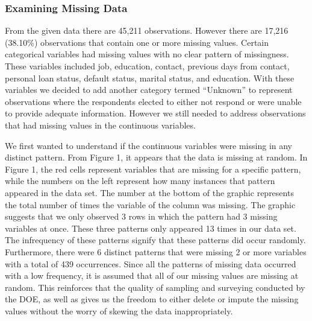 \documentclass[]{article}
\begin{document}
\hypertarget{examining-missing-data}{%
\subsubsection{Examining Missing Data}\label{examining-missing-data}}

From the given data there are 45,211 observations. However there are
17,216 (38.10\%) observations that contain one or more missing values.
Certain categorical variables had missing values with no clear pattern
of missingness. These variables included job, education, contact,
previous days from contact, personal loan status, default status,
marital status, and education. With these variables we decided to add
another category termed ``Unknown'' to represent observations where the
respondents elected to either not respond or were unable to provide
adequate information. However we still needed to address observations
that had missing values in the continuous variables.

We first wanted to understand if the continuous variables were missing
in any distinct pattern. From Figure 1, it appears that the data is
missing at random. In Figure 1, the red cells represent variables that
are missing for a specific pattern, while the numbers on the left
represent how many instances that pattern appeared in the data set. The
number at the bottom of the graphic represents the total number of times
the variable of the column was missing. The graphic suggests that we
only observed 3 rows in which the pattern had 3 missing variables at
once. These three patterns only appeared 13 times in our data set. The
infrequency of these patterns signify that these patterns did occur
randomly. Furthermore, there were 6 distinct patterns that were missing
2 or more variables with a total of 439 occurrences. Since all the
patterns of missing data occurred with a low frequency, it is assumed
that all of our missing values are missing at random. This reinforces
that the quality of sampling and surveying conducted by the DOE, as well
as gives us the freedom to either delete or impute the missing values
without the worry of skewing the data inappropriately.
\end{document}
